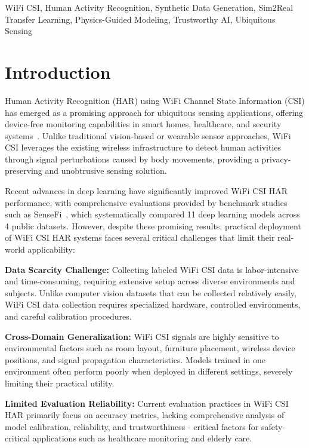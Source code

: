 \documentclass[journal]{IEEEtran}
\begin{document}
\begin{IEEEkeywords}
WiFi CSI, Human Activity Recognition, Synthetic Data Generation, Sim2Real Transfer Learning, Physics-Guided Modeling, Trustworthy AI, Ubiquitous Sensing
\end{IEEEkeywords}

\section{Introduction}

Human Activity Recognition (HAR) using WiFi Channel State Information (CSI) has emerged as a promising approach for ubiquitous sensing applications, offering device-free monitoring capabilities in smart homes, healthcare, and security systems~\cite{csi_survey2019}. Unlike traditional vision-based or wearable sensor approaches, WiFi CSI leverages the existing wireless infrastructure to detect human activities through signal perturbations caused by body movements, providing a privacy-preserving and unobtrusive sensing solution.

Recent advances in deep learning have significantly improved WiFi CSI HAR performance, with comprehensive evaluations provided by benchmark studies such as SenseFi~\cite{yang2023sensefi}, which systematically compared 11 deep learning models across 4 public datasets. However, despite these promising results, practical deployment of WiFi CSI HAR systems faces several critical challenges that limit their real-world applicability:

\textbf{Data Scarcity Challenge:} Collecting labeled WiFi CSI data is labor-intensive and time-consuming, requiring extensive setup across diverse environments and subjects. Unlike computer vision datasets that can be collected relatively easily, WiFi CSI data collection requires specialized hardware, controlled environments, and careful calibration procedures.

\textbf{Cross-Domain Generalization:} WiFi CSI signals are highly sensitive to environmental factors such as room layout, furniture placement, wireless device positions, and signal propagation characteristics. Models trained in one environment often perform poorly when deployed in different settings, severely limiting their practical utility.

\textbf{Limited Evaluation Reliability:} Current evaluation practices in WiFi CSI HAR primarily focus on accuracy metrics, lacking comprehensive analysis of model calibration, reliability, and trustworthiness - critical factors for safety-critical applications such as healthcare monitoring and elderly care.
\end{document}
